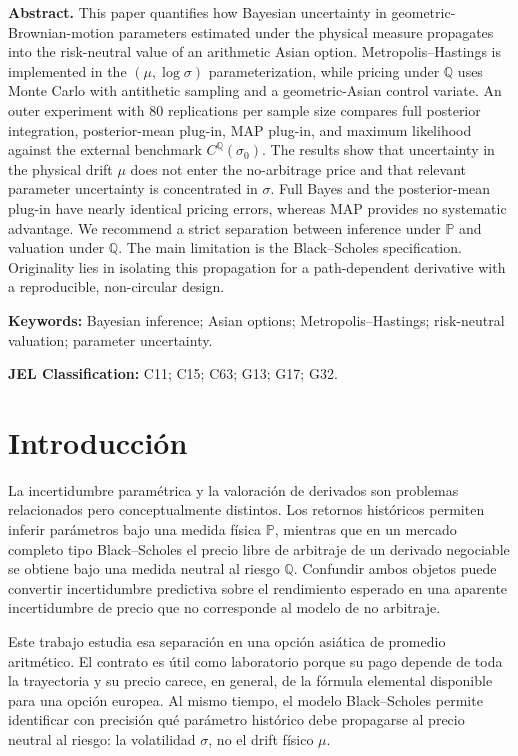 \documentclass[12pt,letterpaper]{article}
\newcommand{\Pmeasure}{\mathbb{P}}
\newcommand{\Qmeasure}{\mathbb{Q}}
\begin{document}
\vspace{0.35cm}
\textbf{Abstract.} This paper quantifies how Bayesian uncertainty in geometric-Brownian-motion parameters estimated under the physical measure propagates into the risk-neutral value of an arithmetic Asian option. Metropolis--Hastings is implemented in the $(\mu,\log\sigma)$ parameterization, while pricing under $\mathbb Q$ uses Monte Carlo with antithetic sampling and a geometric-Asian control variate. An outer experiment with 80 replications per sample size compares full posterior integration, posterior-mean plug-in, MAP plug-in, and maximum likelihood against the external benchmark $C^{\mathbb Q}(\sigma_0)$. The results show that uncertainty in the physical drift $\mu$ does not enter the no-arbitrage price and that relevant parameter uncertainty is concentrated in $\sigma$. Full Bayes and the posterior-mean plug-in have nearly identical pricing errors, whereas MAP provides no systematic advantage. We recommend a strict separation between inference under $\mathbb P$ and valuation under $\mathbb Q$. The main limitation is the Black--Scholes specification. Originality lies in isolating this propagation for a path-dependent derivative with a reproducible, non-circular design.

\textbf{Keywords:} Bayesian inference; Asian options; Metropolis--Hastings; risk-neutral valuation; parameter uncertainty.

\textbf{JEL Classification:} C11; C15; C63; G13; G17; G32.


\section{Introducción}

La incertidumbre paramétrica y la valoración de derivados son problemas relacionados pero conceptualmente distintos. Los retornos históricos permiten inferir parámetros bajo una medida física $\Pmeasure$, mientras que en un mercado completo tipo Black--Scholes el precio libre de arbitraje de un derivado negociable se obtiene bajo una medida neutral al riesgo $\Qmeasure$. Confundir ambos objetos puede convertir incertidumbre predictiva sobre el rendimiento esperado en una aparente incertidumbre de precio que no corresponde al modelo de no arbitraje.

Este trabajo estudia esa separación en una opción asiática de promedio aritmético. El contrato es útil como laboratorio porque su pago depende de toda la trayectoria y su precio carece, en general, de la fórmula elemental disponible para una opción europea. Al mismo tiempo, el modelo Black--Scholes permite identificar con precisión qué parámetro histórico debe propagarse al precio neutral al riesgo: la volatilidad $\sigma$, no el drift físico $\mu$.
\end{document}
